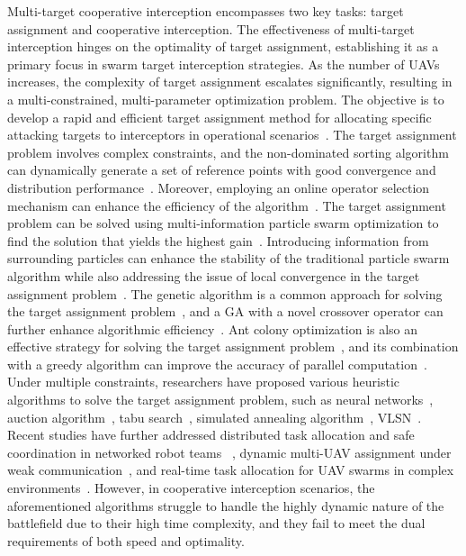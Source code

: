 \documentclass[lettersize,journal]{IEEEtran}
\newcommand{\hladd}[1]{{\color{blue}#1}}
\begin{document}
Multi-target cooperative interception encompasses two key tasks: target assignment and
cooperative interception.
The effectiveness of multi-target interception hinges on the optimality of target assignment,
establishing it as a primary focus in swarm target interception strategies.
As the number of UAVs increases, the complexity of target assignment escalates significantly,
resulting in a multi-constrained, multi-parameter optimization problem.
The objective is to develop a rapid and efficient target assignment method for allocating
specific attacking targets to interceptors in operational scenarios~\cite{KLINE2019226}.
The target assignment problem involves complex constraints, and the non-dominated sorting
algorithm can dynamically generate a set of reference points with good convergence and
distribution performance~\cite{WANG2025952,bai2024hybrid,zou2024moea}.
Moreover, employing an online operator selection mechanism can enhance the efficiency of the
algorithm~\cite{ahmad2024fuzzy,ming2024constrained}.
The target assignment problem can be solved using multi-information particle swarm optimization
to find the solution that yields the highest gain~\cite{mishra2015weapon,wei2020particle}.
Introducing information from surrounding particles can enhance the stability of the traditional
particle swarm algorithm while also addressing the issue of local convergence in the target
assignment problem~\cite{long2024improved}.
The genetic algorithm is a common approach for solving the target assignment
problem~\cite{he4914655modelling,li2020multi,sun2022multi,chang2018solving}, and a GA with a
novel crossover operator can further enhance algorithmic efficiency~\cite{weng2024diversity}.
Ant colony optimization is also an effective strategy for solving the target assignment
problem~\cite{li2024comprehensive}, and its combination with a greedy algorithm can improve
the accuracy of parallel computation~\cite{yi2024solving}.
Under multiple constraints, researchers have proposed various heuristic algorithms to solve the
target assignment problem, such as neural networks~\cite{li2024comprehensive}, auction
algorithm~\cite{wang2024collaborative}, tabu search~\cite{yao2024tabu}, simulated annealing
algorithm~\cite{khurshid2024hybrid}, VLSN~\cite{yue2024graph}.
\hladd{Recent studies have further addressed distributed task allocation
and safe coordination in networked robot teams
~\cite{miele2025distributed}, dynamic multi-UAV assignment under weak
communication~\cite{yu2025dynamic}, and real-time task allocation for UAV
swarms in complex environments~\cite{wang2026realtime}.}
However, in cooperative interception scenarios, the aforementioned algorithms struggle to
handle the highly dynamic nature of the battlefield due to their high time complexity, and they
fail to meet the dual requirements of both speed and optimality.
\end{document}
